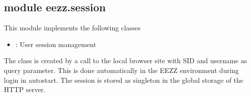 \documentclass[letterpaper,10pt,english]{sphinxmanual}
\begin{document}
\subsection{module eezz.session}
\label{\detokenize{eezz:module-eezz.session}}\label{\detokenize{eezz:module-eezz-session}}
\sphinxAtStartPar
This module implements the following classes
\begin{itemize}
\item {} 
\sphinxAtStartPar
{\hyperref[\detokenize{eezz:eezz.session.TSession}]{}}: User session management

\end{itemize}

\sphinxAtStartPar
The class is created by a call to the local browser site with SID and user\sphinxhyphen{}name as query parameter. This is done
automatically in the EEZZ environment during login in autostart. The session is stored as singleton in the
global storage of the HTTP server.
\end{document}
